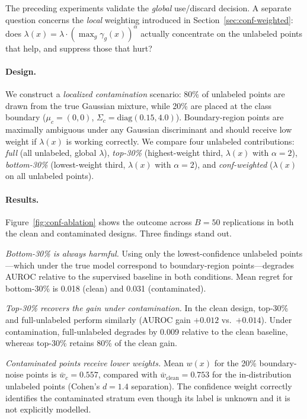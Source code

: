 \documentclass[11pt]{article}
\theoremstyle{definition}
\begin{document}
The preceding experiments validate the \emph{global} use/discard decision.
A separate question concerns the \emph{local} weighting introduced in
Section~\ref{sec:conf-weighted}:
does \(\lambda(x) = \lambda \cdot (\max_g \gamma_g(x))^\alpha\) actually
concentrate on the unlabeled points that help, and suppress those that hurt?

\paragraph{Design.}
We construct a \emph{localized contamination} scenario:
80\% of unlabeled points are drawn from the true Gaussian mixture,
while 20\% are placed at the class boundary
(\(\mu_c = (0,0)\), \(\Sigma_c = \mathrm{diag}(0.15, 4.0)\)).
Boundary-region points are maximally ambiguous under any Gaussian
discriminant and should receive low weight if \(\lambda(x)\) is working correctly.
We compare four unlabeled contributions:
\emph{full} (all unlabeled, global \(\lambda\)),
\emph{top-30\%} (highest-weight third, \(\lambda(x)\) with \(\alpha=2\)),
\emph{bottom-30\%} (lowest-weight third, \(\lambda(x)\) with \(\alpha=2\)),
and \emph{conf-weighted} (\(\lambda(x)\) on all unlabeled points).

\paragraph{Results.}
Figure~\ref{fig:conf-ablation} shows the outcome across
\(B=50\) replications in both the clean and contaminated designs.
Three findings stand out.

\emph{Bottom-30\% is always harmful.}
Using only the lowest-confidence unlabeled points---which under
the true model correspond to boundary-region points---degrades
AUROC relative to the supervised baseline in both conditions.
Mean regret for bottom-30\% is 0.018 (clean) and 0.031 (contaminated).

\emph{Top-30\% recovers the gain under contamination.}
In the clean design, top-30\% and full-unlabeled perform similarly
(AUROC gain $+0.012$ vs.\ $+0.014$).
Under contamination, full-unlabeled degrades by 0.009 relative to
the clean baseline, whereas top-30\% retains 80\% of the clean gain.

\emph{Contaminated points receive lower weights.}
Mean \(w(x)\) for the 20\% boundary-noise points is
\(\bar{w}_c = 0.557\), compared with
\(\bar{w}_{\text{clean}} = 0.753\) for the in-distribution unlabeled points
(Cohen's \(d = 1.4\) separation).
The confidence weight correctly identifies the contaminated stratum
even though its label is unknown and it is not explicitly modelled.
\end{document}

